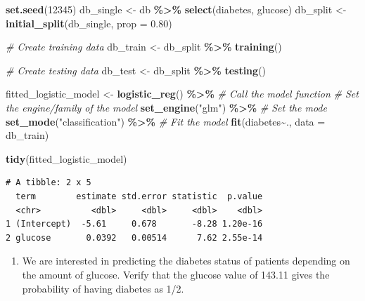\documentclass[
]{book}
\newenvironment{Shaded}{\begin{snugshade}}{\end{snugshade}}
\newcommand{\AttributeTok}[1]{\textcolor[rgb]{0.13,0.29,0.53}{#1}}
\newcommand{\CommentTok}[1]{\textcolor[rgb]{0.56,0.35,0.01}{\textit{#1}}}
\newcommand{\DecValTok}[1]{\textcolor[rgb]{0.00,0.00,0.81}{#1}}
\newcommand{\FloatTok}[1]{\textcolor[rgb]{0.00,0.00,0.81}{#1}}
\newcommand{\FunctionTok}[1]{\textcolor[rgb]{0.13,0.29,0.53}{\textbf{#1}}}
\newcommand{\NormalTok}[1]{#1}
\newcommand{\OtherTok}[1]{\textcolor[rgb]{0.56,0.35,0.01}{#1}}
\newcommand{\SpecialCharTok}[1]{\textcolor[rgb]{0.81,0.36,0.00}{\textbf{#1}}}
\newcommand{\StringTok}[1]{\textcolor[rgb]{0.31,0.60,0.02}{#1}}
\providecommand{\tightlist}{%
  \setlength{\itemsep}{0pt}\setlength{\parskip}{0pt}}
\begin{document}
\begin{Shaded}
\begin{Highlighting}[]
\FunctionTok{set.seed}\NormalTok{(}\DecValTok{12345}\NormalTok{)}
\NormalTok{db\_single }\OtherTok{\textless{}{-}}\NormalTok{ db }\SpecialCharTok{\%\textgreater{}\%} \FunctionTok{select}\NormalTok{(diabetes, glucose)}
\NormalTok{db\_split }\OtherTok{\textless{}{-}} \FunctionTok{initial\_split}\NormalTok{(db\_single, }\AttributeTok{prop =} \FloatTok{0.80}\NormalTok{)}

\CommentTok{\# Create training data}
\NormalTok{db\_train }\OtherTok{\textless{}{-}}\NormalTok{ db\_split }\SpecialCharTok{\%\textgreater{}\%} \FunctionTok{training}\NormalTok{()}

\CommentTok{\# Create testing data}
\NormalTok{db\_test }\OtherTok{\textless{}{-}}\NormalTok{ db\_split }\SpecialCharTok{\%\textgreater{}\%} \FunctionTok{testing}\NormalTok{()}

\NormalTok{fitted\_logistic\_model }\OtherTok{\textless{}{-}} \FunctionTok{logistic\_reg}\NormalTok{() }\SpecialCharTok{\%\textgreater{}\%} \CommentTok{\# Call the model function}
        \CommentTok{\# Set the engine/family of the model}
        \FunctionTok{set\_engine}\NormalTok{(}\StringTok{"glm"}\NormalTok{) }\SpecialCharTok{\%\textgreater{}\%}
        \CommentTok{\# Set the mode}
        \FunctionTok{set\_mode}\NormalTok{(}\StringTok{"classification"}\NormalTok{) }\SpecialCharTok{\%\textgreater{}\%}
        \CommentTok{\# Fit the model}
        \FunctionTok{fit}\NormalTok{(diabetes}\SpecialCharTok{\textasciitilde{}}\NormalTok{., }\AttributeTok{data =}\NormalTok{ db\_train)}

\FunctionTok{tidy}\NormalTok{(fitted\_logistic\_model)}
\end{Highlighting}
\end{Shaded}

\begin{verbatim}
# A tibble: 2 x 5
  term        estimate std.error statistic  p.value
  <chr>          <dbl>     <dbl>     <dbl>    <dbl>
1 (Intercept)  -5.61     0.678       -8.28 1.20e-16
2 glucose       0.0392   0.00514      7.62 2.55e-14
\end{verbatim}

\begin{enumerate}
\def\labelenumi{\alph{enumi}.}
\setcounter{enumi}{1}
\tightlist
\item
  We are interested in predicting the diabetes status of patients depending on the amount of glucose. Verify that the glucose value of 143.11 gives the probability of having diabetes as 1/2.
\end{enumerate}
\end{document}
